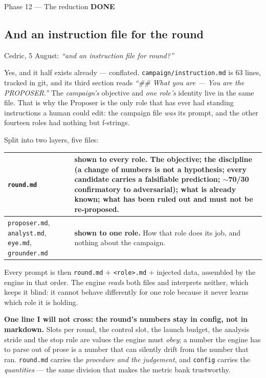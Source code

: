 \documentclass[11pt,a4paper]{article}
\newcommand{\code}[1]{\texttt{#1}}
\newcommand{\done}{\textcolor{good}{\textbf{DONE}}}
\begin{document}
\begin{phasebox}{Phase 12 --- The reduction \hfill \done}
\subsection*{And an instruction file for the round}
Cedric, 5 August: \emph{``and an instruction file for round?''}

Yes, and it half exists already --- conflated. \code{campaign/instruction.md} is 63 lines, tracked in
git, and its third section reads \emph{``\#\# What you are --- You are the PROPOSER.''} The
\emph{campaign's} objective and \emph{one role's} identity live in the same file. That is why the
Proposer is the only role that has ever had standing instructions a human could edit: the campaign
file \emph{was} its prompt, and the other fourteen roles had nothing but f-strings.

Split into two layers, five files:

\begin{center}\small
\begin{tabular}{lp{7.3cm}}
\toprule
\code{round.md} & \textbf{shown to every role.} The objective; the discipline (a change of numbers is
not a hypothesis; every candidate carries a falsifiable prediction; $\sim$70/30 confirmatory to
adversarial); what is already known; what has been ruled out and must not be re-proposed. \\
\midrule
\code{proposer.md}, \code{analyst.md}, \code{eye.md}, \code{grounder.md} &
\textbf{shown to one role.} How that role does its job, and nothing about the campaign. \\
\bottomrule
\end{tabular}
\end{center}

\noindent Every prompt is then \code{round.md} $+$ \code{<role>.md} $+$ injected data, assembled by
the engine in that order. The engine \emph{reads} both files and interprets neither, which keeps it
blind: it cannot behave differently for one role because it never learns which role it is holding.

\textbf{One line I will not cross: the round's numbers stay in config, not in markdown.} Slots per
round, the control slot, the launch budget, the analysis stride and the stop rule are values the
engine must \emph{obey}; a number the engine has to parse out of prose is a number that can silently
drift from the number that ran. \code{round.md} carries the \emph{procedure and the judgement}, and
\code{config} carries the \emph{quantities} --- the same division that makes the metric bank
trustworthy.


\end{phasebox}
\end{document}
